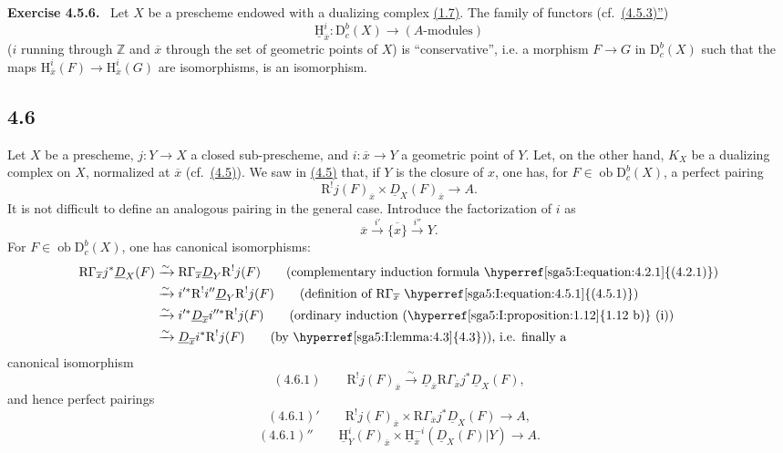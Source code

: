 \documentclass[11pt]{article}
\providecommand{\uH}{\underline{\mathrm H}}
\newenvironment{statement}[1]{\par\medskip\noindent\textbf{#1.}\ }{\par\medskip}
\renewcommand{\H}{\mathrm{H}}
\newcommand{\R}{\mathrm{R}}
\newcommand{\D}{\mathrm{D}}
\newcommand{\Z}{\mathbb{Z}}
\newcommand{\ob}{\operatorname{ob}}
\newcommand{\ol}[1]{\overline{#1}}
\providecommand{\ob}{\operatorname{ob}}
\providecommand{\R}{\mathrm R}
\providecommand{\Z}{\mathbb Z}
\begin{document}
\label{sga5:I:exercise:4.5.6}\begin{statement}{Exercise 4.5.6}
Let $X$ be a prescheme endowed with a dualizing complex \hyperref[sga5:I:definition:1.7]{(1.7)}. The family of functors (cf.~\hyperref[sga5:I:equation:4.5.3:3]{(4.5.3)''})
\[
\underline{\H}_{\ol{x}}^i:\D_c^b(X)\longrightarrow (A\text{-modules})
\]
($i$ running through $\Z$ and $\ol{x}$ through the set of geometric points of $X$) is ``conservative'', i.e. a morphism $F\to G$ in $\D_c^b(X)$ such that the maps $\H_{\ol{x}}^i(F)\to\H_{\ol{x}}^i(G)$ are isomorphisms, is an isomorphism.
\end{statement}

\subsection*{4.6}\label{sga5:I:subsection:4.6}
Let $X$ be a prescheme, $j:Y\to X$ a closed sub-prescheme, and $i:\ol{x}\to Y$ a geometric point of $Y$. Let, on the other hand, $K_X$ be a dualizing complex on $X$, normalized at $\ol{x}$ (cf.~\hyperref[sga5:I:subsection:4.5]{(4.5)}). We saw in \hyperref[sga5:I:subsection:4.5]{(4.5)} that, if $Y$ is the closure of $x$, one has, for $F\in\ob\D_c^b(X)$, a perfect pairing
\[
\R^{!}j(F)_{\ol{x}}\times \underline{D}_X(F)_{\ol{x}}\longrightarrow A.
\]
It is not difficult to define an analogous pairing in the general case. Introduce the factorization of $i$ as
\[
\ol{x}\xrightarrow{i'}\ol{\{x\}}\xrightarrow{i''}Y.
\]
For $F\in\ob\D_c^b(X)$, one has canonical isomorphisms:\[
\begin{aligned}
\R\Gamma_{\ol{x}}j^*\underline{D}_X(F)&\xrightarrow{\sim}\R\Gamma_{\ol{x}}\underline{D}_Y\R^{!}j(F)\qquad\text{(complementary induction formula \hyperref[sga5:I:equation:4.2.1]{(4.2.1)})}\\
&\xrightarrow{\sim}i'^*\R^{!}i''\underline{D}_Y\R^{!}j(F)\qquad\text{(definition of $\R\Gamma_{\ol{x}}$ \hyperref[sga5:I:equation:4.5.1]{(4.5.1)})}\\
&\xrightarrow{\sim}i'^*\underline{D}_{\ol{x}}i''^*\R^{!}j(F)\qquad\text{(ordinary induction (\hyperref[sga5:I:proposition:1.12]{1.12 b)} (i))}\\
&\xrightarrow{\sim}\underline{D}_{\ol{x}}i^*\R^{!}j(F)\qquad\text{(by \hyperref[sga5:I:lemma:4.3]{4.3})), i.e. finally a}
\end{aligned}
\]
canonical isomorphism
\label{sga5:I:equation:4.6.1}\[
(4.6.1)\qquad \R^{!}j(F)_{\ol{x}}\xrightarrow{\sim}\underline{D}_{\ol{x}}\R\Gamma_{\ol{x}}j^*\underline{D}_X(F),
\]
and hence perfect pairings
\label{sga5:I:equation:4.6.1:2}\[
(4.6.1)'\qquad \R^{!}j(F)_{\ol{x}}\times \R\Gamma_{\ol{x}}j^*\underline{D}_X(F)\longrightarrow A,
\]
\label{sga5:I:equation:4.6.1:3}\[
(4.6.1)''\qquad \uH_Y^i(F)_{\ol{x}}\times \uH_{\ol{x}}^{-i}(\underline{D}_X(F)|Y)\longrightarrow A.
\]
\end{document}
